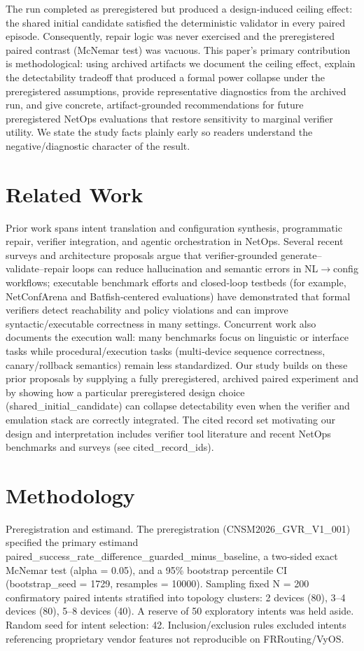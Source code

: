\documentclass[conference]{IEEEtran}
\begin{document}
The run completed as preregistered but produced a design‑induced ceiling effect: the shared initial candidate satisfied the deterministic validator in every paired episode. Consequently, repair logic was never exercised and the preregistered paired contrast (McNemar test) was vacuous. This paper's primary contribution is methodological: using archived artifacts we document the ceiling effect, explain the detectability tradeoff that produced a formal power collapse under the preregistered assumptions, provide representative diagnostics from the archived run, and give concrete, artifact‑grounded recommendations for future preregistered NetOps evaluations that restore sensitivity to marginal verifier utility. We state the study facts plainly early so readers understand the negative/diagnostic character of the result.

\section{Related Work}
Prior work spans intent translation and configuration synthesis, programmatic repair, verifier integration, and agentic orchestration in NetOps. Several recent surveys and architecture proposals argue that verifier‑grounded generate--validate--repair loops can reduce hallucination and semantic errors in NL\ensuremath{\rightarrow}config workflows; executable benchmark efforts and closed‑loop testbeds (for example, NetConfArena and Batfish‑centered evaluations) have demonstrated that formal verifiers detect reachability and policy violations and can improve syntactic/executable correctness in many settings. Concurrent work also documents the execution wall: many benchmarks focus on linguistic or interface tasks while procedural/execution tasks (multi‑device sequence correctness, canary/rollback semantics) remain less standardized. Our study builds on these prior proposals by supplying a fully preregistered, archived paired experiment and by showing how a particular preregistered design choice (shared\_initial\_candidate) can collapse detectability even when the verifier and emulation stack are correctly integrated. The cited record set motivating our design and interpretation includes verifier tool literature and recent NetOps benchmarks and surveys (see cited\_record\_ids).

\section{Methodology}
Preregistration and estimand. The preregistration (CNSM2026\_GVR\_V1\_001) specified the primary estimand paired\_success\_rate\_difference\_guarded\_minus\_baseline, a two‑sided exact McNemar test (alpha = 0.05), and a 95\% bootstrap percentile CI (bootstrap\_seed = 1729, resamples = 10000). Sampling fixed N = 200 confirmatory paired intents stratified into topology clusters: 2 devices (80), 3--4 devices (80), 5--8 devices (40). A reserve of 50 exploratory intents was held aside. Random seed for intent selection: 42. Inclusion/exclusion rules excluded intents referencing proprietary vendor features not reproducible on FRRouting/VyOS.
\end{document}
